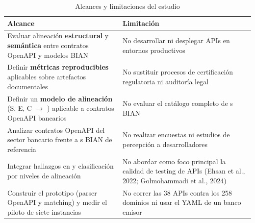 \begin{table}[H]
  \centering
  \caption{Alcances y limitaciones del estudio}
  \label{tab:alcances}
  \begin{tabular}{@{}p{}p{}@{}}
    \toprule
    \textbf{Alcance} & \textbf{Limitación} \\
    \midrule
    Evaluar alineación \textbf{estructural} y \textbf{semántica} entre contratos OpenAPI y modelos BIAN &
    No desarrollar ni desplegar APIs en entornos productivos \\
    Definir \textbf{métricas reproducibles} aplicables sobre artefactos documentales &
    No sustituir procesos de certificación regulatoria ni auditoría legal \\
    Definir un \textbf{modelo de alineación} (S, E, C $\rightarrow$ \AlignmentScore{}) aplicable a contratos OpenAPI bancarios &
    No evaluar el catálogo completo de \ServiceDomain{}s BIAN \\
    Analizar contratos OpenAPI del sector bancario frente a \ServiceDomain{}s BIAN de referencia &
    No realizar encuestas ni estudios de percepción a desarrolladores \\
    Integrar hallazgos en \AlignmentScore{} y clasificación por niveles de alineación &
    No abordar como foco principal la calidad de testing de APIs (Ehsan et al., 2022; Golmohammadi et al., 2024) \\
    Construir el prototipo (parser OpenAPI y matching) y medir el piloto de siete instancias &
    No correr las 38 APIs contra los 258 dominios ni usar el YAML de un banco emisor \\
    \bottomrule
  \end{tabular}
\end{table}

